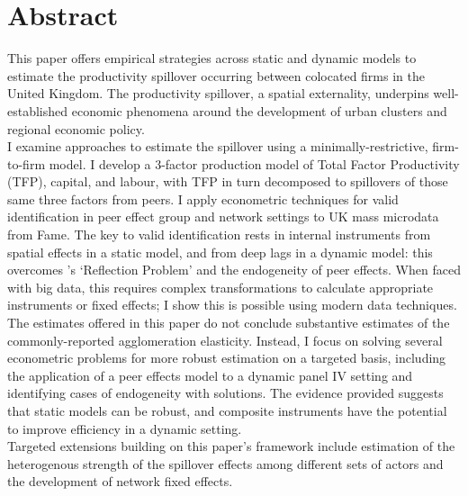 \section*{Abstract}

\begin{center}
    This paper offers empirical strategies across static and dynamic models to
    estimate the productivity spillover occurring between colocated firms in the United Kingdom.
    The productivity spillover, a spatial externality, underpins well-established economic phenomena
    around the development of urban clusters and regional economic policy.
    \\[0.9em]
    I examine approaches to estimate the spillover using a minimally-restrictive,
    firm-to-firm model. I develop a 3-factor production model of Total Factor Productivity (TFP),
    capital, and labour, with TFP in turn decomposed to spillovers of those same three factors from peers.
    I apply econometric techniques for valid identification
    in peer effect group and network settings to UK mass microdata from Fame.
    The key to valid identification rests in internal instruments from spatial  effects
    in a static model, and from deep lags in a dynamic model:
    this overcomes \cite{Manski1993}'s `Reflection Problem' and the endogeneity of peer effects.
    When faced with big data, this requires complex transformations to
    calculate appropriate instruments or fixed effects;
    I show this is possible using modern data techniques.
    \\[0.9em]
    The estimates offered in this paper do not conclude substantive
    estimates of the commonly-reported agglomeration elasticity.
    Instead, I focus on solving several econometric problems for more robust
    estimation on a targeted basis, including the application of
    a peer effects model to a dynamic panel IV setting
    and identifying cases of endogeneity with solutions.
    The evidence provided suggests that static models can be robust,
    and composite instruments have the potential to
    improve efficiency in a dynamic setting.
    \\[0.9em]
    Targeted extensions building on this paper's framework
    include estimation of the heterogenous strength of the spillover effects
    among different sets of actors and the development of network fixed effects.


\end{center}